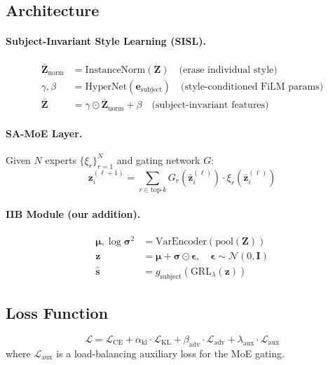 \documentclass{article}
\newcommand{\mL}{\mathcal{L}}
\newcommand{\mN}{\mathcal{N}}
\newcommand{\bz}{\bm{z}}
\newcommand{\bmu}{\bm{\mu}}
\newcommand{\bsigma}{\bm{\sigma}}
\begin{document}
\subsection{Architecture}

\paragraph{Subject-Invariant Style Learning (SISL).}
\begin{align}
\bar{\bm{Z}}_\text{norm} &= \text{InstanceNorm}(\bm{Z}) \quad \text{(erase individual style)} \\
\gamma, \beta &= \text{HyperNet}(\bm{e}_\text{subject}) \quad \text{(style-conditioned FiLM params)} \\
\bar{\bm{Z}} &= \gamma \odot \bar{\bm{Z}}_\text{norm} + \beta \quad \text{(subject-invariant features)}
\end{align}

\paragraph{SA-MoE Layer.}
Given $N$ experts $\{\xi_r\}_{r=1}^N$ and gating network $G$:
\begin{equation}
\bm{z}^{(\ell+1)}_i = \sum_{r \in \text{top-}k} G_r(\bar{\bm{z}}^{(\ell)}_i) \cdot \xi_r(\bar{\bm{z}}^{(\ell)}_i)
\end{equation}

\paragraph{IIB Module (our addition).}
\begin{align}
\bmu, \log\bsigma^2 &= \text{VarEncoder}(\text{pool}(\bm{Z})) \\
\bz &= \bmu + \bsigma \odot \bm{\epsilon}, \quad \bm{\epsilon} \sim \mN(0, \bm{I}) \\
\hat{\bm{s}} &= g_\text{subject}(\text{GRL}_\lambda(\bz))
\end{align}

\subsection{Loss Function}

\begin{equation}
\mL = \mL_\text{CE} + \alpha_\text{kl} \cdot \mL_\text{KL} + \beta_\text{adv} \cdot \mL_\text{adv} + \lambda_\text{aux} \cdot \mL_\text{aux}
\end{equation}
where $\mL_\text{aux}$ is a load-balancing auxiliary loss for the MoE gating.
\end{document}
